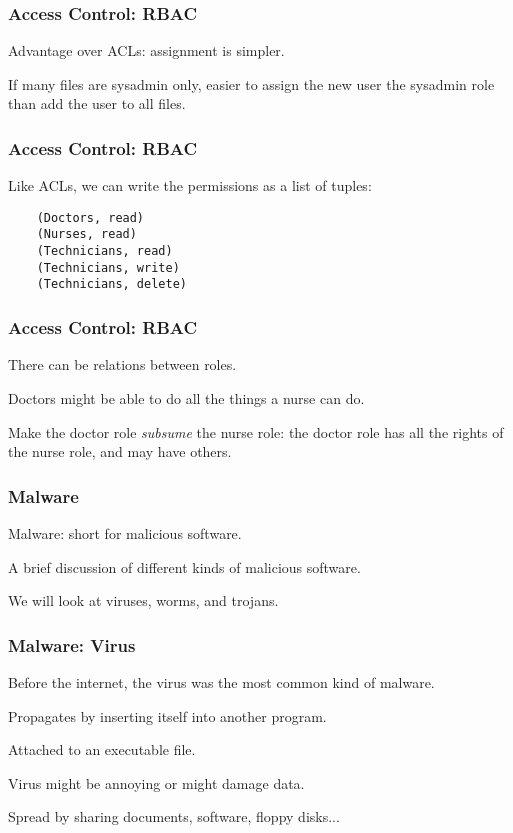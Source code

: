 \begin{frame}
\frametitle{Access Control: RBAC}
\begin{changemargin}{1cm}

Advantage over ACLs: assignment is simpler.

If many files are sysadmin only, easier to assign the new user the sysadmin role than add the user to all files.

\end{changemargin}
\end{frame}

\begin{frame}[fragile]
\frametitle{Access Control: RBAC}
\begin{changemargin}{1cm}

Like ACLs, we can write the permissions as a list of tuples:
\begin{verbatim}
	(Doctors, read)
	(Nurses, read)
	(Technicians, read)
	(Technicians, write)
	(Technicians, delete)
\end{verbatim}

\end{changemargin}
\end{frame}

\begin{frame}
\frametitle{Access Control: RBAC}
\begin{changemargin}{1cm}

There can be relations between roles.

Doctors might be able to do all the things a nurse can do. 

Make the doctor role \textit{subsume} the nurse role: the doctor role has all the rights of the nurse role, and may have others.

\end{changemargin}
\end{frame}


\begin{frame}
\frametitle{Malware}
\begin{changemargin}{1cm}

\alert{Malware}: short for malicious software.

A brief discussion of different kinds of malicious software.

We will look at viruses, worms, and trojans.

\end{changemargin}
\end{frame}


\begin{frame}
\frametitle{Malware: Virus}
\begin{changemargin}{1cm}

Before the internet, the virus was the most common kind of malware.

Propagates by inserting itself into another program.

Attached to an executable file.

Virus might be annoying or might damage data.

Spread by sharing documents, software, floppy disks...

\end{changemargin}
\end{frame}

